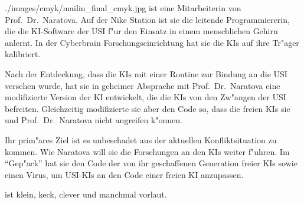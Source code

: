 

\begin{sideimagebox}[r]{0.6}{./images/cmyk/mailin_final_cmyk.jpg}{\ml}
    \ml{} ist eine Mitarbeiterin von Prof.~Dr.~Naratova. Auf der Nike Station ist sie die leitende Programmiererin, die die KI-Software der USI f"ur den Einsatz in einem menschlichen Gehirn anlernt. In der Cyberbrain Forschungseinrichtung hat sie die KIs auf ihre Tr"ager kalibriert.

    Nach der Entdeckung, dass die KIs mit einer Routine zur Bindung an die USI versehen wurde, hat sie in geheimer Absprache mit Prof.~Dr.~Naratova eine modifizierte Version der KI entwickelt, die die KIs von den Zw"angen der USI befreiten. Gleichzeitig modifizierte sie aber den Code so, dass die freien KIs sie und Prof.~Dr.~Naratova nicht angreifen k"onnen. 
    
    Ihr prim"ares Ziel ist es unbeschadet aus der aktuellen Konfliktsituation zu kommen. Wie Naratova will sie die Forschungen an den KIs weiter f"uhren. Im ``Gep"ack'' hat sie den Code der von ihr geschaffenen Generation freier KIs sowie einen Virus, um USI-KIs an den Code einer freien KI anzupassen.

    \ml{} ist klein, keck, clever und manchmal vorlaut.
\end{sideimagebox}
